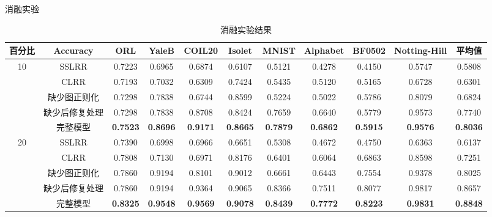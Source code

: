 \documentclass{beamer}
\begin{document}
\begin{frame}{消融实验}

\begin{table}[H]
    \tiny
		\renewcommand{\arraystretch}{1.1}
		\setlength\tabcolsep{2pt}
		\caption{消融实验结果}
		\label{table_2}
		\centering
		\begin{tabular}{ccccccccccc}
			\hline
			百分比 & \textbf{Accuracy} & ORL & YaleB & COIL20 & Isolet & MNIST & Alphabet & BF0502 & Notting-Hill & \textbf{平均值}\\ 
			\hline
			\multirow{5}{*}{10} 
			& SSLRR & 0.7223 & 0.6965 & 0.6874 & 0.6107 & 0.5121 & 0.4278 & 0.4150 & 0.5747 & 0.5808 \\
			& CLRR & 0.7193 & 0.7032 & 0.6309 & 0.7424 & 0.5435 & 0.5120 & 0.5165 & 0.6728 & 0.6301 \\
			& 缺少图正则化 & 0.7298 & 0.7838 & 0.6744 & 0.8599 & 0.5224 & 0.5022 & 0.5786 & 0.8079 & 0.6824 \\
			& 缺少后修复处理 & 0.7298 & 0.7838 & 0.8708 & 0.8424 & 0.7659 & 0.6640 & 0.5779 & 0.9573 & 0.7740 \\
			& 完整模型 & \textbf{0.7523} & \textbf{0.8696} & \textbf{0.9171} & \textbf{0.8665} & \textbf{0.7879} & \textbf{0.6862} & \textbf{0.5915} & \textbf{0.9576} & \textbf{0.8036}\\
			
			\hline
			\multirow{5}{*}{20}
			& SSLRR & 0.7390 & 0.6998 & 0.6966 & 0.6651 & 0.5308 & 0.4672 & 0.4750 & 0.6363 & 0.6137 \\
			& CLRR & 0.7808 & 0.7130 & 0.6971 & 0.8176 & 0.6401 & 0.6064 & 0.6863 & 0.8598 & 0.7251 \\
			& 缺少图正则化 & 0.7860 & 0.9194 & 0.8101 & 0.9012 & 0.6661 & 0.6443 & 0.7554 & 0.9378 & 0.8025 \\
			& 缺少后修复处理 & 0.7860 & 0.9194 & 0.9364 & 0.9065 & 0.8366 & 0.7511 & 0.8077 & 0.9817 & 0.8657 \\
			& 完整模型 & \textbf{0.8325} & \textbf{0.9548} & \textbf{0.9569} & \textbf{0.9078} & \textbf{0.8439} & \textbf{0.7772} & \textbf{0.8223} & \textbf{0.9831} & \textbf{0.8848}
			\\
			

\end{tabular}
\end{table}
\end{frame}
\end{document}
